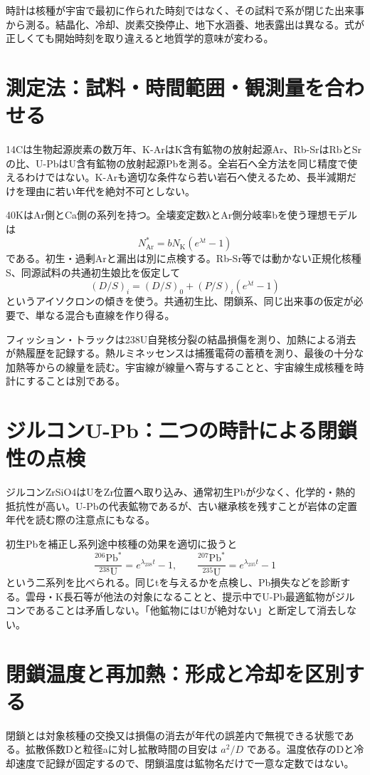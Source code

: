 時計は核種が宇宙で最初に作られた時刻ではなく、その試料で系が閉じた出来事から測る。結晶化、冷却、炭素交換停止、地下水涵養、地表露出は異なる。式が正しくても開始時刻を取り違えると地質学的意味が変わる。

\section{測定法：試料・時間範囲・観測量を合わせる}
\label{theory:isotope:method}
14Cは生物起源炭素の数万年、K-ArはK含有鉱物の放射起源Ar、Rb-SrはRbとSrの比、U-PbはU含有鉱物の放射起源Pbを測る。全岩石へ全方法を同じ精度で使えるわけではない。K-Arも適切な条件なら若い岩石へ使えるため、長半減期だけを理由に若い年代を絶対不可としない\cite{iso_radiometric}。

40KはAr側とCa側の系列を持つ。全壊変定数λとAr側分岐率bを使う理想モデルは
\[
 N_{\mathrm{Ar}}^{*}=bN_{\mathrm K}(e^{\lambda t}-1)
\]
である。初生・過剰Arと漏出は別に点検する。Rb-Sr等では動かない正規化核種S、同源試料の共通初生娘比を仮定して
\[
 (D/S)_i=(D/S)_0+(P/S)_i(e^{\lambda t}-1)
\]
というアイソクロンの傾きを使う。共通初生比、閉鎖系、同じ出来事の仮定が必要で、単なる混合も直線を作り得る。

フィッション・トラックは238U自発核分裂の結晶損傷を測り、加熱による消去が熱履歴を記録する。熱ルミネッセンスは捕獲電荷の蓄積を測り、最後の十分な加熱等からの線量を読む。宇宙線が線量へ寄与することと、宇宙線生成核種を時計にすることは別である。

\section{ジルコンU-Pb：二つの時計による閉鎖性の点検}
\label{theory:isotope:upb}
ジルコンZrSiO4はUをZr位置へ取り込み、通常初生Pbが少なく、化学的・熱的抵抗性が高い。U-Pbの代表鉱物であるが、古い継承核を残すことが岩体の定置年代を読む際の注意点にもなる\cite{iso_zircon}。

初生Pbを補正し系列途中核種の効果を適切に扱うと
\[
 \frac{{}^{206}\mathrm{Pb}^{*}}{{}^{238}\mathrm U}
 =e^{\lambda_{238}t}-1,\qquad
 \frac{{}^{207}\mathrm{Pb}^{*}}{{}^{235}\mathrm U}
 =e^{\lambda_{235}t}-1
\]
という二系列を比べられる。同じtを与えるかを点検し、Pb損失などを診断する。雲母・K長石等が他法の対象になることと、提示中でU-Pb最適鉱物がジルコンであることは矛盾しない。「他鉱物にはUが絶対ない」と断定して消去しない。

\section{閉鎖温度と再加熱：形成と冷却を区別する}
\label{theory:isotope:closure}
閉鎖とは対象核種の交換又は損傷の消去が年代の誤差内で無視できる状態である。拡散係数Dと粒径aに対し拡散時間の目安は \(a^2/D\) である。温度依存のDと冷却速度で記録が固定するので、閉鎖温度は鉱物名だけで一意な定数ではない。

